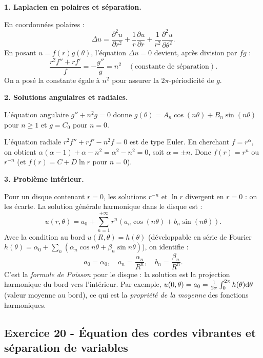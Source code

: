 \documentclass[12pt,a4paper]{article}
\begin{document}
\begin{boitecorrige}

\textbf{1. Laplacien en polaires et séparation.}

En coordonnées polaires :
\[
\Delta u = \frac{\partial^2 u}{\partial r^2} + \frac{1}{r}\frac{\partial u}{\partial r} + \frac{1}{r^2}\frac{\partial^2 u}{\partial\theta^2}.
\]
En posant $u = f(r)g(\theta)$, l'équation $\Delta u = 0$ devient, après division par $fg$ :
\[
\frac{r^2 f'' + r f'}{f} = -\frac{g''}{g} = n^2 \quad (\text{constante de séparation}).
\]
On a posé la constante égale à $n^2$ pour assurer la $2\pi$-périodicité de $g$.

\textbf{2. Solutions angulaires et radiales.}

L'équation angulaire $g'' + n^2 g = 0$ donne $g(\theta) = A_n\cos(n\theta) + B_n\sin(n\theta)$ pour $n\ge 1$ et $g = C_0$ pour $n=0$.

L'équation radiale $r^2 f'' + r f' - n^2 f = 0$ est de type Euler. En cherchant $f = r^\alpha$, on obtient $\alpha(\alpha-1) + \alpha - n^2 = \alpha^2 - n^2 = 0$, soit $\alpha = \pm n$. Donc $f(r) = r^n$ ou $r^{-n}$ (et $f(r) = C + D\ln r$ pour $n=0$).

\textbf{3. Problème intérieur.}

Pour un disque contenant $r=0$, les solutions $r^{-n}$ et $\ln r$ divergent en $r=0$ : on les écarte. La solution générale harmonique dans le disque est :
\[
u(r,\theta) = a_0 + \sum_{n=1}^{+\infty} r^n\!\left(a_n\cos(n\theta) + b_n\sin(n\theta)\right).
\]
Avec la condition au bord $u(R,\theta) = h(\theta)$ (développable en série de Fourier $h(\theta) = \alpha_0 + \sum_n (\alpha_n\cos n\theta + \beta_n\sin n\theta)$), on identifie :
\[
a_0 = \alpha_0, \quad a_n = \frac{\alpha_n}{R^n}, \quad b_n = \frac{\beta_n}{R^n}.
\]
C'est la \emph{formule de Poisson} pour le disque : la solution est la projection harmonique du bord vers l'intérieur. Par exemple, $u(0,\theta) = a_0 = \frac{1}{2\pi}\int_0^{2\pi} h(\theta)\mathrm{d}\theta$ (valeur moyenne au bord), ce qui est la \emph{propriété de la moyenne} des fonctions harmoniques.

\end{boitecorrige}

\subsection*{Exercice 20 - Équation des cordes vibrantes et séparation de variables \niveau{\difficile}}
\end{document}
